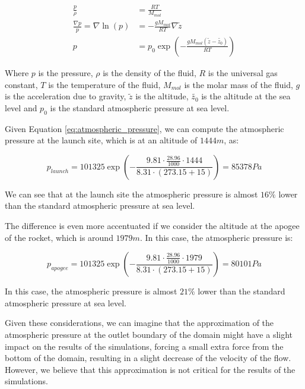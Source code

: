 \begin{align}
    \frac{p}{\rho}                     & = \frac{RT}{M_{mol}}                                                   \\
    \frac{\nabla p}{p} = \nabla \ln(p) & = - \frac{g M_{mol}}{RT} \nabla \tilde{z}                              \\
    p                                  & = p_0 \exp\left(-\frac{g M_{mol} (\tilde{z} - \tilde{z_0})}{RT}\right)
    \label{eq:atmospheric_pressure}
\end{align}

Where $p$ is the pressure, $\rho$ is the density of the fluid, $R$ is the universal gas constant, $T$ is the temperature of the fluid, $M_{mol}$ is the molar mass of the fluid, $g$ is the acceleration due to gravity, $\tilde{z}$ is the altitude, $\tilde{z_0}$ is the altitude at the sea level and $p_0$ is the standard atmospheric pressure at sea level.

Given Equation \ref{eq:atmospheric_pressure}, we can compute the atmospheric pressure at the launch site, which is at an altitude of $1444m$, as:

\begin{equation}
    p_{launch} = 101325 \exp\left(-\frac{9.81 \cdot \frac{28.96}{1000} \cdot 1444}{8.31 \cdot (273.15 + 15)}\right) = 85378Pa
\end{equation}

We can see that at the launch site the atmospheric pressure is almost $16\%$ lower than the standard atmospheric pressure at sea level.

The difference is even more accentuated if we consider the altitude at the apogee of the rocket, which is around $1979m$.
In this case, the atmospheric pressure is:

\begin{equation}
    p_{apogee} = 101325 \exp\left(-\frac{9.81 \cdot \frac{28.96}{1000} \cdot 1979}{8.31 \cdot (273.15 + 15)}\right) = 80101Pa
\end{equation}

In this case, the atmospheric pressure is almost $21\%$ lower than the standard atmospheric pressure at sea level.

Given these considerations, we can imagine that the approximation of the atmospheric pressure at the outlet boundary of the domain might have a slight impact on the results of the simulations, forcing a small extra force from the bottom of the domain, resulting in a slight decrease of the velocity of the flow.
However, we believe that this approximation is not critical for the results of the simulations.


